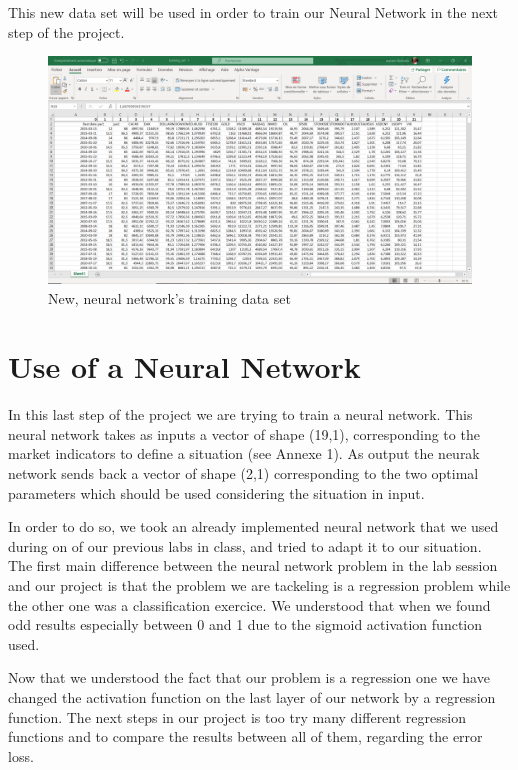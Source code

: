 \documentclass[]{article}
\begin{document}
\vskip 0.5cm
This new data set will be used in order to train our Neural Network in the next step of the project. 

\begin{figure}[hbt!]
	\center{}
	\includegraphics[scale=0.15]{image/training_set.png}
	\caption{New, neural network's training data set}
\end{figure}


\section{Use of a Neural Network}
\vskip 0.5cm
In this last step of the project we are trying to train a neural network. This neural network takes as inputs a vector of shape (19,1), corresponding to the market indicators to define a situation (see Annexe 1). As output the neurak network sends back a vector of shape (2,1) corresponding to the two optimal parameters which should be used considering the situation in input.

\vskip 0.5cm
In order to do so, we took an already implemented neural network that we used during on of our previous labs in class, and tried to adapt it to our situation. \\
The first main difference between the neural network problem in the lab session and our project is that the problem we are tackeling is a regression problem while the other one was a classification exercice. We understood that when we found odd results especially between 0 and 1 due to the sigmoid activation function used.

\vskip 0.5cm
Now that we understood the fact that our problem is a regression one we have changed the activation function on the last layer of our network by a regression function. The next steps in our project is too try many different regression functions and to compare the results between all of them, regarding the error loss. 
\end{document}
